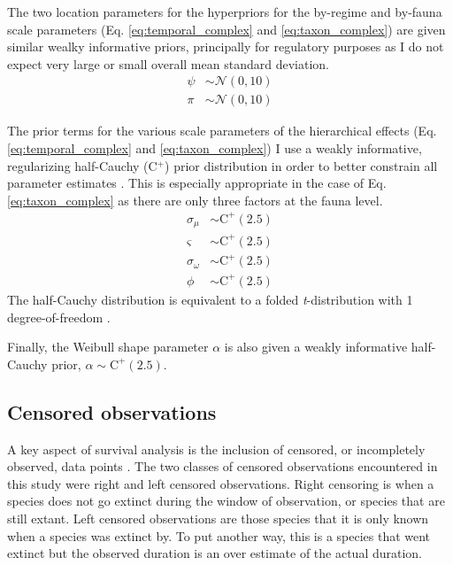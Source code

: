 \documentclass[12pt,letterpaper]{article}
\begin{document}
The two location parameters for the hyperpriors for the by-regime and by-fauna scale parameters (Eq. \ref{eq:temporal_complex} and \ref{eq:taxon_complex}) are given similar wealky informative priors, principally for regulatory purposes as I do not expect very large or small overall mean standard deviation.
\begin{equation}
  \begin{aligned}
    \psi &\sim \mathcal{N}(0, 10) \\
    \pi &\sim \mathcal{N}(0, 10) 
  \end{aligned}
  \label{eq:location_priors}
\end{equation}

The prior terms for the various scale parameters of the hierarchical effects (Eq. \ref{eq:temporal_complex} and \ref{eq:taxon_complex}) I use a weakly informative, regularizing half-Cauchy (C\(^{+}\)) prior distribution in order to better constrain all parameter estimates \citep{Gelman2013d}. This is especially appropriate in the case of Eq. \ref{eq:taxon_complex} as there are only three factors at the fauna level. 
\begin{equation}
  \begin{aligned}
    \sigma_{\mu} &\sim \mathrm{C}^{+}(2.5) \\
    \varsigma &\sim \mathrm{C}^{+}(2.5) \\
    \sigma_{\omega} &\sim \mathrm{C}^{+}(2.5) \\
    \phi &\sim \mathrm{C}^{+}(2.5)
  \end{aligned}
  \label{eq:scale_priors}
\end{equation}
The half-Cauchy distribution is equivalent to a folded \textit{t}-distribution with 1 degree-of-freedom \citep{Gelman2013d}.

Finally, the Weibull shape parameter \(\alpha\) is also given a weakly informative half-Cauchy prior, \(\alpha \sim \mathrm{C}^{+}(2.5)\). 

\subsection{Censored observations}
A key aspect of survival analysis is the inclusion of censored, or incompletely observed, data points \citep{Ibrahim2001,Klein2003}. The two classes of censored observations encountered in this study were right and left censored observations. Right censoring is when a species does not go extinct during the window of observation, or species that are still extant. Left censored observations are those species that it is only known when a species was extinct by. To put another way, this is a species that went extinct but the observed duration is an over estimate of the actual duration. 
\end{document}
